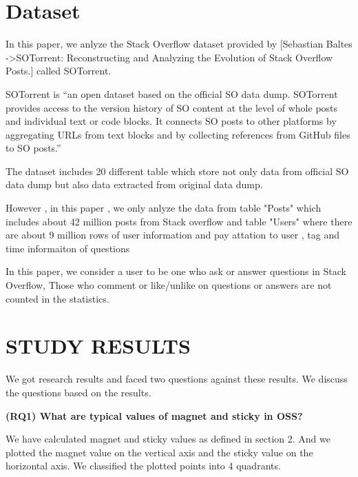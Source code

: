 \documentclass[conference]{IEEEtran}
\begin{document}
\section{Dataset}
In this paper, we anlyze the Stack Overflow dataset provided by [Sebastian Baltes ->SOTorrent: Reconstructing and Analyzing the Evolution of Stack Overflow Posts.] called SOTorrent. 

SOTorrent is “an open dataset based on the official SO data dump. SOTorrent provides access to the version history of SO content at the level of whole posts and individual text or code blocks. It connects SO posts to other platforms by aggregating URLs from text blocks and by collecting references from GitHub files to SO posts.”

The dataset includes 20 different table which store not only data from official SO data dump but also data extracted from original data dump.

However , in this paper , we only anlyze the data from table "Posts" which includes about 42 million posts from Stack overflow and table "Users" where there are about 9 million rows of user information and pay attation to user , tag and time informaiton of questions

In this paper, we consider a user to be one who ask or answer questions in Stack Overflow, Those who comment or like/unlike on questions or answers are not counted in the statistics.

\section{STUDY RESULTS} %
We got research results and faced two questions against these results. We discuss the questions based on the results.

\textbf{(RQ1) What are typical values of magnet and sticky in OSS?}

We have calculated magnet and sticky values as defined in section 2. And we plotted the magnet value on the vertical axis and the sticky value on the horizontal axis. We classified the plotted points into 4 quadrants.
\end{document}
